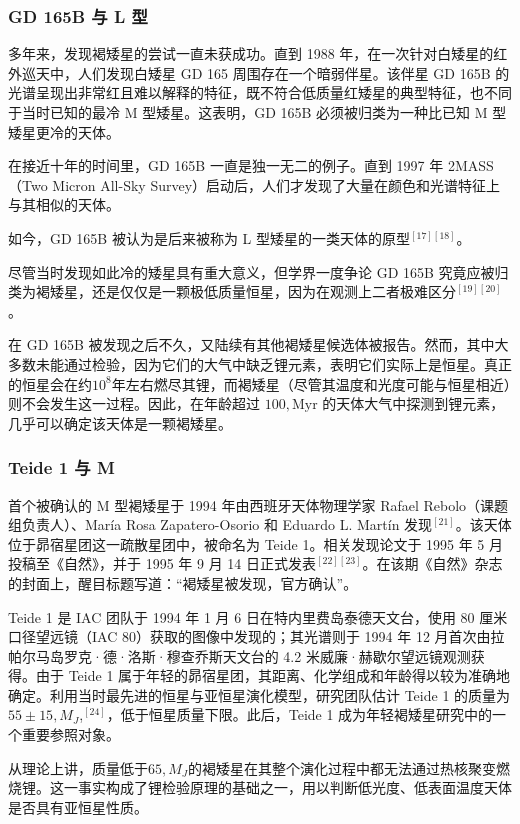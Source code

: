 \subsubsection{GD 165B 与 L 型}

多年来，发现褐矮星的尝试一直未获成功。直到 1988 年，在一次针对白矮星的红外巡天中，人们发现白矮星 GD 165 周围存在一个暗弱伴星。该伴星 GD 165B 的光谱呈现出非常红且难以解释的特征，既不符合低质量红矮星的典型特征，也不同于当时已知的最冷 M 型矮星。这表明，GD 165B 必须被归类为一种比已知 M 型矮星更冷的天体。

在接近十年的时间里，GD 165B 一直是独一无二的例子。直到 1997 年 2MASS（Two Micron All-Sky Survey）启动后，人们才发现了大量在颜色和光谱特征上与其相似的天体。

如今，GD 165B 被认为是后来被称为 L 型矮星的一类天体的原型$^{[17][18]}$。

尽管当时发现如此冷的矮星具有重大意义，但学界一度争论 GD 165B 究竟应被归类为褐矮星，还是仅仅是一颗极低质量恒星，因为在观测上二者极难区分$^{[19][20]}$。

在 GD 165B 被发现之后不久，又陆续有其他褐矮星候选体被报告。然而，其中大多数未能通过检验，因为它们的大气中缺乏锂元素，表明它们实际上是恒星。真正的恒星会在约$10^8$年左右燃尽其锂，而褐矮星（尽管其温度和光度可能与恒星相近）则不会发生这一过程。因此，在年龄超过 $100,\mathrm{Myr}$ 的天体大气中探测到锂元素，几乎可以确定该天体是一颗褐矮星。
\subsubsection{Teide 1 与 M }
首个被确认的 M 型褐矮星于 1994 年由西班牙天体物理学家 Rafael Rebolo（课题组负责人）、María Rosa Zapatero-Osorio 和 Eduardo L. Martín 发现$^{[21]}$。该天体位于昴宿星团这一疏散星团中，被命名为 Teide 1。相关发现论文于 1995 年 5 月投稿至《自然》，并于 1995 年 9 月 14 日正式发表$^{[22][23]}$。在该期《自然》杂志的封面上，醒目标题写道：“褐矮星被发现，官方确认”。

Teide 1 是 IAC 团队于 1994 年 1 月 6 日在特内里费岛泰德天文台，使用 80 厘米口径望远镜（IAC 80）获取的图像中发现的；其光谱则于 1994 年 12 月首次由拉帕尔马岛罗克·德·洛斯·穆查乔斯天文台的 4.2 米威廉·赫歇尔望远镜观测获得。由于 Teide 1 属于年轻的昴宿星团，其距离、化学组成和年龄得以较为准确地确定。利用当时最先进的恒星与亚恒星演化模型，研究团队估计 Teide 1 的质量为$55 \pm 15,M_J$,$^{[24]}$，低于恒星质量下限。此后，Teide 1 成为年轻褐矮星研究中的一个重要参照对象。

从理论上讲，质量低于$65,M_J$的褐矮星在其整个演化过程中都无法通过热核聚变燃烧锂。这一事实构成了锂检验原理的基础之一，用以判断低光度、低表面温度天体是否具有亚恒星性质。

